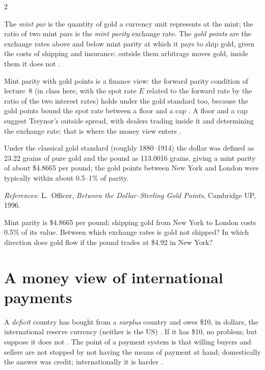 \begin{paracol}{2}
\begin{definition}
The \emph{mint par} is the quantity of gold a currency unit represents at the mint; the ratio of two mint pars is the \emph{mint parity} exchange rate. The \emph{gold
points} are the exchange rates above and below mint parity at which it pays to ship gold, given the costs of shipping and insurance: outside them arbitrage moves gold,
inside them it does not .
\end{definition}

Mint parity with gold points is a finance view: the forward parity condition of lecture~8 (in class here, with the spot rate $E$ related to the forward rate by the ratio of
the two interest rates) holds under the gold standard too, because the gold points bound the spot rate between a floor and a cap .
A floor and a cap suggest Treynor's outside spread, with dealers trading inside it and determining the exchange rate: that is where the money view enters
.

\begin{history}
Under the classical gold standard (roughly 1880--1914) the dollar was defined as 23.22 grains of pure gold and the pound as 113.0016 grains, giving a mint parity of
about \$4.8665 per pound; the gold points between New York and London were typically within about 0.5--1\% of parity.\par
\emph{References:} L.~Officer, \emph{Between the Dollar--Sterling Gold Points}, Cambridge UP, 1996.
\end{history}

\begin{exercise}
Mint parity is \$4.8665 per pound; shipping gold from New York to London costs 0.5\% of its value. Between which exchange rates is gold not shipped? In which direction does gold
flow if the pound trades at \$4.92 in New York?
\end{exercise}

\section{A money view of international payments}\label{sec:cm-fxdealers}

A \emph{deficit} country has bought from a \emph{surplus} country and owes \$10, in dollars, the international reserve currency (neither is the US)
. If it has \$10, no problem; but suppose it does not . The point of a payment system is that willing buyers
and sellers are not stopped by not having the means of payment at hand; domestically the answer was credit; internationally it is harder .


\end{paracol}
